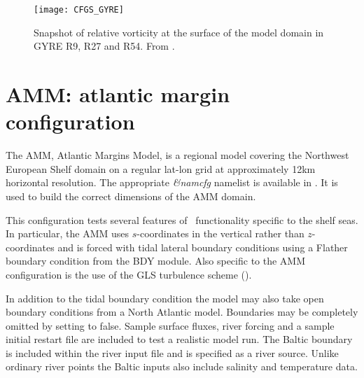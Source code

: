 \documentclass[../main/NEMO_manual]{subfiles}
\begin{document}
\begin{figure}[!t]
  \centering
  \texttt{[image: CFGS\_GYRE]}
  \caption[Snapshot of relative vorticity at the surface of the model domain in GYRE R9, R27 and R54]{
    Snapshot of relative vorticity at the surface of the model domain in GYRE R9, R27 and R54.
    From \citet{levy.klein.ea_OM10}.}
  \label{fig:CFGS_GYRE}
\end{figure}

\section{AMM: atlantic margin configuration}
\label{sec:CFGS_config_AMM}

The AMM, Atlantic Margins Model, is a regional model covering the Northwest European Shelf domain on
a regular lat-lon grid at approximately 12km horizontal resolution.
The appropriate \textit{\&namcfg} namelist  is available in .
It is used to build the correct dimensions of the AMM domain.

This configuration tests several features of \NEMO\ functionality specific to the shelf seas.
In particular, the AMM uses $s$-coordinates in the vertical rather than $z$-coordinates and
is forced with tidal lateral boundary conditions using a Flather boundary condition from the BDY module.
Also specific to the AMM configuration is the use of the GLS turbulence scheme ().

In addition to the tidal boundary condition the model may also take open boundary conditions from
a North Atlantic model.
Boundaries may be completely omitted by setting  to false.
Sample surface fluxes, river forcing and a sample initial restart file are included to test a realistic model run.
The Baltic boundary is included within the river input file and is specified as a river source.
Unlike ordinary river points the Baltic inputs also include salinity and temperature data.

\subinc{}
\end{document}
